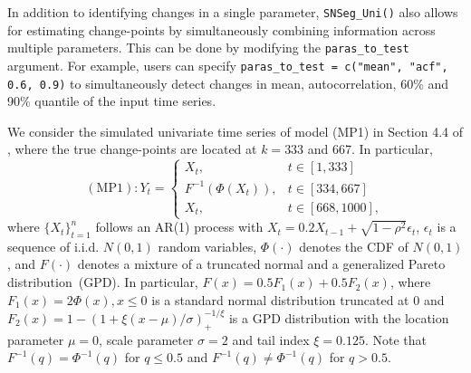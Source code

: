 



In addition to identifying changes in a single parameter, \texttt{SNSeg\_Uni()} also allows for estimating change-points by simultaneously combining information across multiple parameters. This can be done by modifying the \texttt{paras\_to\_test} argument. For example, users can specify \texttt{paras\_to\_test = c("mean", "acf", 0.6, 0.9)} to simultaneously detect changes in mean, autocorrelation, 60\% and 90\% quantile of the input time series.


We consider the simulated univariate time series of model (MP1) in Section 4.4 of \cite{zhao2021segmenting}, where the true change-points are located at $k=333$ and 667. In particular, 
$$
(\mathrm{MP} 1): Y_t= \begin{cases}X_t, & t \in[1,333] \\ F^{-1}\left(\Phi\left(X_t\right)\right), & t \in[334,667] \\ X_t, & t \in[668,1000],\end{cases}
$$
where $\{X_t\}_{t=1}^n$ follows an AR(1) process with $X_t=0.2 X_{t-1}+\sqrt{1-\rho^2}\epsilon_t$, $\epsilon_t$ is a sequence of  i.i.d.  $N(0,1)$ random variables, $\Phi(\cdot)$ denotes the CDF of $N(0,1)$, and $F(\cdot)$ denotes a mixture of a truncated normal and a generalized Pareto distribution~(GPD). In particular, $F(x)=0.5F_1(x)+0.5F_2(x)$, where $F_1(x)=2\Phi(x), x\leq 0$ is a standard normal distribution truncated at 0 and $F_2(x)=1-(1+\xi(x-\mu)/\sigma)_+^{-1/\xi}$ is a GPD distribution with the location parameter $\mu=0$, scale parameter $\sigma=2$ and tail index $\xi=0.125$. Note that $F^{-1}(q)=\Phi^{-1}(q)$ for $q\leq 0.5$ and $F^{-1}(q)\neq \Phi^{-1}(q)$ for $q>0.5.$ 

